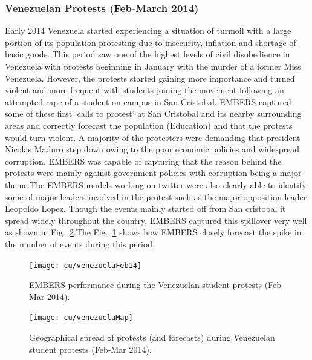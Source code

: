 \subsubsection*{Venezuelan Protests (Feb-March 2014)}
Early 2014 Venezuela started experiencing a situation of turmoil with a 
large portion of its population protesting due to insecurity, inflation 
and shortage of basic goods. This period saw one of the highest levels of
civil disobedience in Venezuela with protests beginning in January with the murder
of a former Miss Venezuela. However, the protests started gaining more importance
 and turned violent and more frequent with students joining the movement following an
attempted rape of a student on campus in San Cristobal. EMBERS captured
some of these first `calls to protest` at San Cristobal and its nearby surrounding areas
 and correctly forecast the population (Education) and that the protests would turn violent. 
A majority of the protesters were demanding that president Nicolas Maduro step down owing
to the poor economic policies and widespread corruption. EMBERS was capable of capturing 
that the reason behind the protests were mainly against government policies with corruption being  
a major theme.The EMBERS models working on twitter were also clearly able to identify some of major 
leaders involved in the protest such as the major opposition leader Leopoldo Lopez.
Though the events mainly started off from San cristobal it spread widely throughout the country, EMBERS
captured this spillover very well as shown in Fig.~\ref{fig:venezuelaMap}.The Fig.~\ref{fig:venezuelaMarch14}
shows how EMBERS closely forecast the spike in the number of events  during this period.
\begin{figure}[H]
\centering
\texttt{[image: cu/venezuelaFeb14]}
\caption{EMBERS performance during the Venezuelan student protests (Feb-Mar 2014).}
\label{fig:venezuelaMarch14}
\end{figure}

\begin{figure}[H]
\centering
\texttt{[image: cu/venezuelaMap]}
\caption{Geographical spread of protests (and forecasts) during
Venezuelan student protests (Feb-Mar 2014).}
\label{fig:venezuelaMap}
\end{figure}

